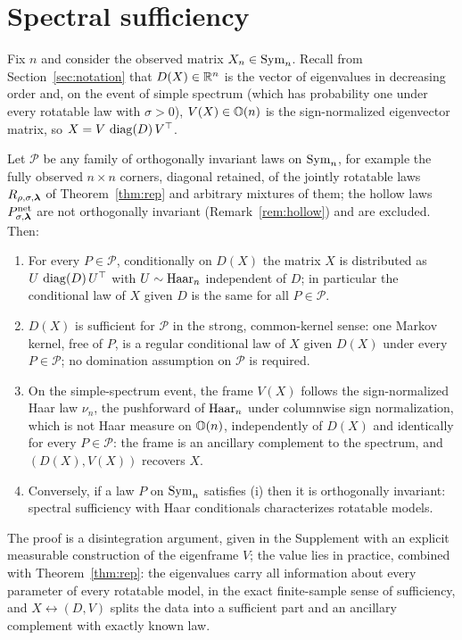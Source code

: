 \section{Spectral sufficiency}
\label{sec:sufficiency}

Fix $n$ and consider the observed matrix $X_n\in\mathrm{Sym}_n$. Recall from
Section~\ref{sec:notation} that $D(X)\in\mathbb{R}^n$ is the vector of eigenvalues
in decreasing order and, on the event of simple spectrum (which has
probability one under every rotatable law with $\sigma>0$), $V(X)\in\mathbb{O}(n)$
is the sign-normalized eigenvector matrix, so
$X = V\,\operatorname{diag}(D)\,V^\top$.

\begin{theorem}
\label{thm:suff}
Let $\mathcal{P}$ be any family of orthogonally invariant laws on
$\mathrm{Sym}_n$, for example the fully observed $n\times n$ corners, diagonal
retained, of the jointly rotatable laws $R_{\rho,\sigma,\bm{\lambda}}$ of
Theorem~\ref{thm:rep} and arbitrary mixtures of them; the hollow laws
$P^{\mathrm{net}}_{\sigma,\bm{\lambda}}$ are not orthogonally invariant
(Remark~\ref{rem:hollow}) and are excluded. Then:
\begin{enumerate}[label=(\roman*),itemsep=1pt,topsep=2pt]
\item For every $P\in\mathcal{P}$, conditionally on $D(X)$ the matrix $X$
is distributed as $U\,\operatorname{diag}(D)\,U^\top$ with $U\sim\mathrm{Haar}_n$
independent of $D$; in particular the conditional law of $X$ given $D$ is
the same for all $P\in\mathcal{P}$.
\item $D(X)$ is sufficient for $\mathcal{P}$ in the strong,
common-kernel sense: one Markov kernel, free of $P$, is a regular
conditional law of $X$ given $D(X)$ under every $P\in\mathcal P$; no
domination assumption on $\mathcal{P}$ is required.
\item On the simple-spectrum event, the frame $V(X)$ follows the
sign-normalized Haar law $\nu_n$, the pushforward of
$\mathrm{Haar}_n$ under columnwise sign normalization, which is not
Haar measure on $\mathbb{O}(n)$, independently of $D(X)$ and identically for
every $P\in\mathcal{P}$: the frame is an ancillary complement to the
spectrum, and $(D(X),V(X))$ recovers $X$.
\item Conversely, if a law $P$ on $\mathrm{Sym}_n$ satisfies (i) then it is
orthogonally invariant: spectral sufficiency with Haar conditionals
characterizes rotatable models.
\end{enumerate}
\end{theorem}

The proof is a disintegration argument, given in the Supplement with
an explicit measurable construction of the eigenframe $V$; the value
lies in practice, combined with Theorem~\ref{thm:rep}: the eigenvalues
carry all information about every parameter of every rotatable model,
in the exact finite-sample sense of sufficiency, and
$X\leftrightarrow(D,V)$ splits the data into a sufficient part and an ancillary complement with exactly known
law.

